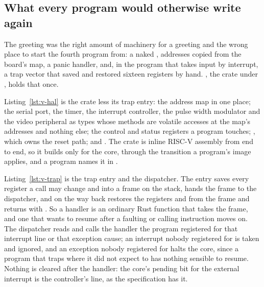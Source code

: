 \documentclass[journal,onecolumn,9pt]{IEEEtran}
\begin{document}
\subsection*{What every program would otherwise write again}
\label{sec:v-hal}

The greeting was the right amount of machinery for a greeting and the
wrong place to start the fourth program from: a naked ,
addresses copied from the board's map, a panic handler, and, in the
program that takes input by interrupt, a trap vector that saved and
restored sixteen registers by hand. , the crate
under , holds that once.

Listing~\ref{lst:v-hal} is the crate less its trap entry: the address
map in one place; the serial port, the timer, the interrupt
controller, the pulse width modulator and the video peripheral as
types whose methods are volatile accesses at the map's addresses and
nothing else; the control and status registers a program touches;
, which owns the reset path; and . The crate
is inline RISC-V assembly from end to end, so it builds only for the
core, through the transition a program's image applies, and a program
names it in .



Listing~\ref{lst:v-trap} is the trap entry and the dispatcher. The
entry saves every register a call may change and  into a
frame on the stack, hands the frame to the dispatcher, and on the way
back restores the registers and  from the frame and returns
with . So a handler is an ordinary Rust function that takes
the frame, and one that wants to resume after a faulting or calling
instruction moves  on. The dispatcher reads
 and calls the handler the program registered for that
interrupt line or that exception cause; an interrupt nobody registered
for is taken and ignored, and an exception nobody registered for halts
the core, since a program that traps where it did not expect to has
nothing sensible to resume. Nothing is cleared after the handler: the
core's pending bit for the external interrupt is the controller's
line, as the specification has it.


\end{document}
